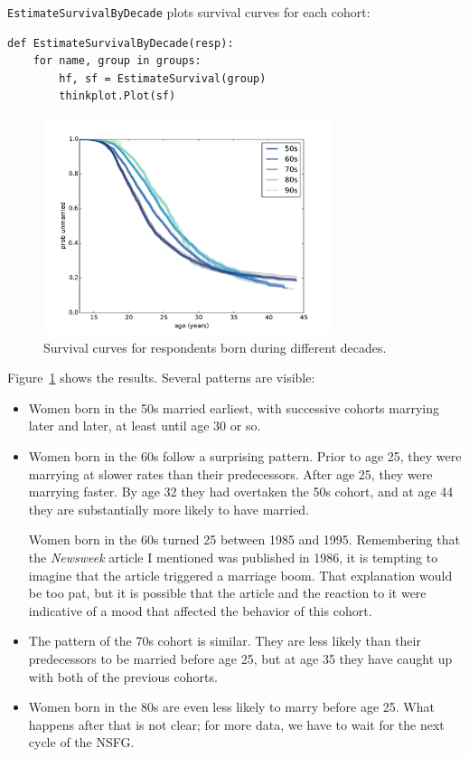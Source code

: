 \documentclass[12pt]{book}
\begin{document}
{\tt EstimateSurvivalByDecade} plots survival curves for each cohort:

\begin{verbatim}
def EstimateSurvivalByDecade(resp):
    for name, group in groups:
        hf, sf = EstimateSurvival(group)
        thinkplot.Plot(sf)
\end{verbatim}

\begin{figure}
\centerline{\includegraphics[height=2.5in]{figs/survival4.pdf}}
\caption{Survival curves for respondents born during different decades.}
\label{survival4}
\end{figure}

Figure~\ref{survival4} shows the results.  Several patterns are
visible:

\begin{itemize}

\item Women born in the 50s married earliest, with successive
  cohorts marrying later and later, at least until age 30 or so.

\item Women born in the 60s follow a surprising pattern.  Prior
to age 25, they were marrying at slower rates than their predecessors.
After age 25, they were marrying faster.  By age 32 they had overtaken
the 50s cohort, and at age 44 they are substantially more likely to
have married.

Women born in the 60s turned 25 between 1985 and 1995.  Remembering
that the {\it Newsweek\/} article I mentioned was published in 1986, it
is tempting to imagine that the article triggered a marriage boom.
That explanation would be too pat, but it is possible that the article
and the reaction to it were indicative of a mood that affected the
behavior of this cohort.

\item The pattern of the 70s cohort is similar.  They are less
likely than their predecessors to be married before age 25, but
at age 35 they have caught up with both of the previous cohorts.

\item Women born in the 80s are even less likely to marry before
age 25.  What happens after that is not clear; for more data, we
have to wait for the next cycle of the NSFG.

\end{itemize}
\end{document}
